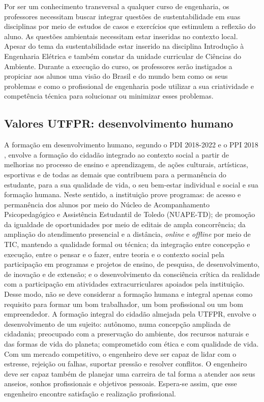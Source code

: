 Por ser um conhecimento transversal a qualquer curso de engenharia, os professores necessitam buscar integrar questões de sustentabilidade em suas disciplinas por meio de estudos de casos e exercícios que estimulem a reflexão do aluno. As questões ambientais necessitam estar inseridas no contexto local.  Apesar do tema da sustentabilidade estar inserido na disciplina Introdução à Engenharia Elétrica e também constar da unidade curricular de Ciências do Ambiente. Durante a execução do curso, os professores serão instigados a propiciar aos alunos uma visão do Brasil e do mundo bem como os seus problemas e como o profissional de engenharia pode utilizar a sua criatividade e competência técnica para solucionar ou minimizar esses problemas.

\subsection{Valores UTFPR: desenvolvimento humano}

A formação em desenvolvimento humano, segundo o PDI 2018-2022 \cite{pdiutfpr} e o PPI 2018 \cite{ppiutfpr}, envolve a formação do cidadão integrado ao contexto social a partir de melhorias no processo de ensino e aprendizagem, de ações culturais, artísticas, esportivas e de todas as demais que contribuem para a permanência do estudante, para a sua qualidade de vida, o seu bem-estar individual e social e sua formação humana.  Neste sentido, a instituição prove programas: de acesso e permanência dos alunos por meio do Núcleo de Acompanhamento Psicopedagógico e Assistência Estudantil de Toledo (NUAPE-TD); de promoção da igualdade de oportunidades por meio de editais de ampla concorrência; da ampliação do atendimento presencial e a distância, \textit{online} e \textit{offline} por meio de TIC, mantendo a qualidade formal ou técnica; da integração entre concepção e execução, entre o pensar e o fazer, entre teoria e o contexto social pela participação em programas e projetos de ensino, de pesquisa, de desenvolvimento, de inovação e de extensão; e o desenvolvimento da consciência crítica da realidade com a  participação em atividades extracurriculares apoiados pela instituição.  Desse modo, não se deve considerar a formação humana e integral apenas como requisito para formar um bom trabalhador, um bom profissional ou um bom empreendedor. A formação integral do cidadão almejada pela UTFPR, envolve o desenvolvimento de um sujeito: autônomo, numa concepção ampliada de cidadania; preocupado com a preservação do ambiente, dos recursos naturais e das formas de vida do planeta; comprometido com ética e com qualidade de vida. Com um mercado competitivo, o engenheiro deve ser capaz de lidar com o estresse, rejeição ou falhas, suportar pressão e resolver conflitos. O engenheiro deve ser capaz também de planejar uma carreira de tal forma a atender aos seus anseios, sonhos profissionais e objetivos pessoais. Espera-se assim, que esse engenheiro encontre satisfação e realização profissional.

